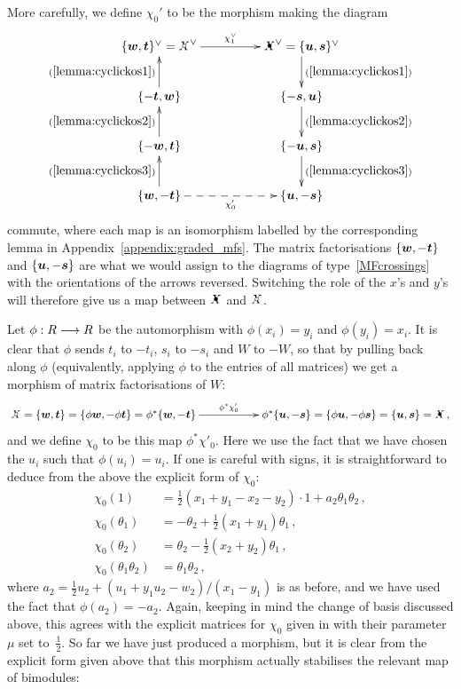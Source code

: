 \documentclass{compositio}
\theoremstyle{definition}
\numberwithin{equation}{section}
\begin{document}
More carefully, we define $\chi_0'$ to be the morphism making the diagram
\[
\xymatrix@C+2pc{
\{ \bs{w}, \bs{t} \}\mdual = \Xcirc\mdual \ar[r]^-{\chi_1\mdual} & \Xbul\mdual = \{ \bs{u}, \bs{s} \}\mdual \ar[d]^-{(\ref{lemma:cyclickos1})}\\
\{ -\bs{t}, \bs{w} \} \ar[u]^-{(\ref{lemma:cyclickos1})} & \{ -\bs{s}, \bs{u} \} \ar[d]^-{(\ref{lemma:cyclickos2})}\\
\{ -\bs{w}, \bs{t} \} \ar[u]^-{(\ref{lemma:cyclickos2})} & \{ -\bs{u}, \bs{s} \} \ar[d]^-{(\ref{lemma:cyclickos3})}\\
\{ \bs{w}, -\bs{t} \} \ar@{-->}[r]_-{\chi_0'} \ar[u]^-{(\ref{lemma:cyclickos3})} & \{ \bs{u}, -\bs{s} \}
}
\]
commute, where each map is an isomorphism labelled by the corresponding lemma in Appendix~\ref{appendix:graded_mfs}. The matrix factorisations $\{ \boldsymbol{w}, -\boldsymbol{t} \}$ and $\{ \boldsymbol{u}, -\boldsymbol{s} \}$ are what we would assign to the diagrams of type~\eqref{MFcrossings} with the orientations of the arrows reversed. Switching the role of the $x$'s and $y$'s will therefore give us a map between $\Xbul$ and $\Xcirc$.

Let $\phi: R \longrightarrow R$ be the automorphism with $\phi(x_i) = y_i$ and $\phi(y_i) = x_i$. It is clear that $\phi$ sends $t_i$ to $-t_i$, $s_i$ to $-s_i$ and $W$ to $-W$, so that by pulling back along $\phi$ (equivalently, applying $\phi$ to the entries of all matrices) we get a morphism of matrix factorisations of $W$: 
\[
\xymatrix{
\Xcirc = \{ \bs{w}, \bs{t} \} = \{ \phi\bs{w}, -\phi \bs{t} \} = \phi^*\{ \bs{w}, -\bs{t} \} \ar[rr]^-{\phi^* \chi'_0} & & \phi^*\{ \bs{u}, -\bs{s} \} = \{ \phi \bs{u}, -\phi \bs{s} \} = \{ \bs{u}, \bs{s} \} = \Xbul \, ,
}
\]
and we define $\chi_0$ to be this map $\phi^* \chi'_0$. Here we use the fact that we have chosen the $u_i$ such that $\phi(u_i) = u_i$. If one is careful with signs, it is straightforward to deduce from the above the explicit form of $\chi_0$:
\begin{align}
\chi_0(1) &= \frac{1}{2}(x_1 + y_1 - x_2 - y_2) \cdot 1 + a_2 \theta_1 \theta_2 \, ,\nonumber \\
\chi_0(\theta_1) &= -\theta_2 + \frac{1}{2}(x_1 + y_1) \theta_1\, ,\nonumber \\
\chi_0(\theta_2) &= \theta_2 - \frac{1}{2}(x_2 + y_2)\theta_1\, , \nonumber \\
\chi_0(\theta_1\theta_2) &= \theta_1\theta_2\,, \label{eq:chi0defn}
\end{align}
where $a_2 = \frac{1}{2}u_2 + (u_1 + y_1 u_2 - w_2)/(x_1-y_1)$ is as before, and we have used the fact that $\phi(a_2) = -a_2$. Again, keeping in mind the change of basis discussed above, this agrees with the explicit matrices for $\chi_0$ given in \cite[p.50]{kr0401268} with their parameter~$\mu$ set to~$\frac{1}{2}$. So far we have just produced a morphism, but it is clear from the explicit form given above that this morphism actually stabilises the relevant map of bimodules:
\end{document}
